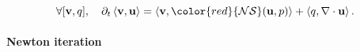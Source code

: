 \documentclass[twocolumn,10pt]{asme2ej}
\newcommand{\be}[1]{ \begin{equation} \label{#1}}
\newcommand{\ee}{\end{equation}}
\begin{document}
\be{NSweak}
\forall [{\bf v},q], \quad \partial_t \left< {\bf v}, {\bf u}\right> = \left< {\bf v} , {\color{red}{\cal NS} ({\bf u},p)} \right> + \left< q, \nabla \cdot {\bf u}\right>.
\ee















\paragraph{Newton iteration}
\end{document}
